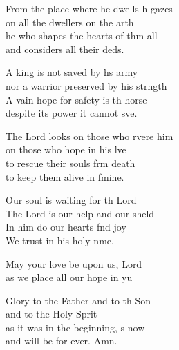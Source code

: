 \begin{psalmverse}
\begin{patverse}
From the place where he dwells h gazes\Med\\
    on all the dwellers on the arth\\
he who shapes the hearts of thm all\Med\\
    and considers all their deds.

A king is not saved by h\pointup{\i}s army\Med\\
    nor a warrior preserved by his strngth\\
A vain hope for safety is th horse\Med\\
    despite its power it cannot sve.

The Lord looks on those who rvere him\Med\\
    on those who hope in his lve\\
to rescue their souls frm death\Med\\
    to keep them alive in fmine.

Our soul is waiting for th Lord\Med\\
    The Lord is our help and our sh\pointup{\i}eld\\
In him do our hearts f\pointup{\i}nd joy\Med\\
    We trust in his holy nme.

May your love be upon us,  Lord\Med\\
    as we place all our hope in yu

Glory to the Father and to th Son\Med\\
    and to the Holy Sp\pointup{\i}rit\\
as it was in the beginning, \pointup{\i}s now\Med\\
    and will be for ever. Amn.
  \end{patverse}
\end{psalmverse}
